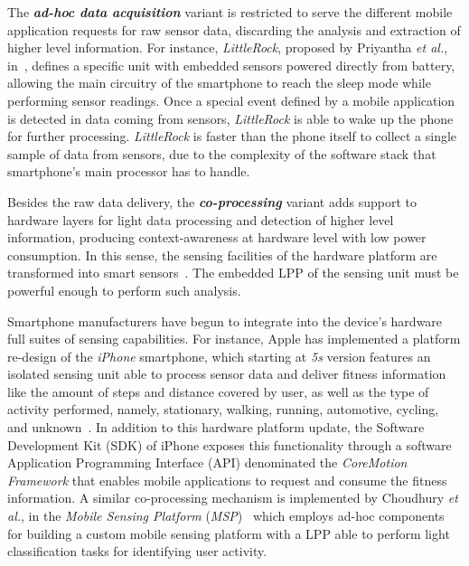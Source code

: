 \documentclass[12pt]{article}
\numberwithin{equation}{section}
\numberwithin{table}{section}
\numberwithin{figure}{section}
\begin{document}


The \emph{\textbf{ad-hoc data acquisition}} variant is restricted to serve the different mobile application requests for raw sensor data, discarding the analysis and extraction of higher level information.
For instance, \emph{LittleRock}, proposed by Priyantha \emph{et al.}, in~\cite{Priyantha2011}, defines a specific unit with embedded sensors powered directly from battery, allowing the main circuitry of the smartphone to reach the sleep mode while performing sensor readings.
Once a special event defined by a mobile application is detected in data coming from sensors, \emph{LittleRock} is able to wake up the phone for further processing.
\emph{LittleRock} is faster than the phone itself to collect a single sample of data from sensors, due to the complexity of the software stack that smartphone's main processor has to handle.

Besides the raw data delivery, the \emph{\textbf{co-processing}} variant adds support to hardware layers for light data processing and detection of higher level information, producing context-awareness at hardware level with low power consumption.
In this sense, the sensing facilities of the hardware platform are transformed into smart sensors~\cite{Gervais-Ducouret2011}.
The embedded LPP of the sensing unit must be powerful enough to perform such analysis.

Smartphone manufacturers have begun to integrate into the device's hardware full suites of sensing capabilities.
For instance, Apple has implemented a platform re-design of the \emph{iPhone} smartphone, which starting at \emph{5s} version features an isolated sensing unit able to process sensor data and deliver fitness information like the amount of steps and distance covered by user, as well as the type of activity performed, namely, stationary, walking, running, automotive, cycling, and unknown~\cite{Apple2015}.
In addition to this hardware platform update, the Software Development Kit (SDK) of iPhone exposes this functionality through a software Application Programming Interface (API) denominated the \emph{CoreMotion Framework} that enables mobile applications to request and consume the fitness information.
A similar co-processing mechanism is implemented by Choudhury \emph{et al.}, in the \emph{Mobile Sensing Platform} (\emph{MSP})~\cite{Choudhury2008} which employs ad-hoc components for building a custom mobile sensing platform with a LPP able to perform light classification tasks for identifying user activity.
\end{document}
